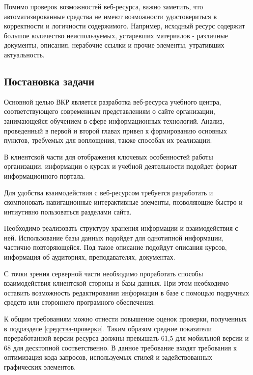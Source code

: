 Помимо проверок возможностей веб-ресурса, важно заметить, что автоматизированные средства не имеют возможности удостовериться в корректности и логичности содержимого.
Например, исходный ресурс содержит большое количество неиспользуемых, устаревших материалов - различные документы, описания, нерабочие ссылки и прочие элементы, утративших актуальность.

\subsection{Постановка задачи}

Основной целью ВКР является разработка веб-ресурса учебного центра, соответствующего современным представлениям о сайте организации, занимающейся обучением в сфере информационных технологий.
Анализ, проведенный в первой и второй главах привел к формированию основных пунктов, требуемых для воплощения, также способах их реализации.

В клиентской части для отображения ключевых особенностей работы организации, информации о курсах и учебной деятельности подойдет формат информационного портала.

Для удобства взаимодействия с веб-ресурсом требуется разработать и скомпоновать навигационные интерактивные элементы, позволяющие быстро и интиутивно пользоваться разделами сайта.

Необходимо реализовать структуру хранения информации и взаимодействия с ней.
Использование базы данных подойдет для однотипной информации, частично повторяющейся.
Под такое описание подойдут описания курсов, информация об аудиториях, преподавателях, документах.

С точки зрения серверной части необходимо проработать способы взаимодействия клиентской стороны и базы данных.
При этом необходимо оставить возможность редактирования информации в базе с помощью подручных средств или стороннего програмного обеспечения.

К общим требованиям можно отнести повышение оценок проверки, полученных в подразделе \ref{средства-проверки}.
Таким образом средние показатели переработанной версии ресурса должны превышать  61,5 для мобильной версии и 68 для десктопной соответственно.
В данное требование входят требования к оптимизация кода запросов, используемых стилей и задействованных графических элементов.

\clearpage
